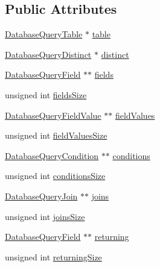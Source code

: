 \subsection*{Public Attributes}
\begin{DoxyCompactItemize}
\item 
\hyperlink{database__query_8h_a38971f81715db3c243144b5e840c2457}{Database\+Query\+Table} $\ast$ \hyperlink{structsDatabaseQuery_a8d34ce4ad0e31c1bc8978ec03d4b5fbf}{table}
\item 
\hyperlink{database__query_8h_a92bb8d2a8239305ec30b4b8c58c4ceba}{Database\+Query\+Distinct} $\ast$ \hyperlink{structsDatabaseQuery_af873390ab854ce4a34f704971d271521}{distinct}
\item 
\hyperlink{database__query_8h_a88215d743b6fc63a879f730b4523dda1}{Database\+Query\+Field} $\ast$$\ast$ \hyperlink{structsDatabaseQuery_a2075e002e2ecbf166d9fbcc6f9780701}{fields}
\item 
unsigned int \hyperlink{structsDatabaseQuery_a052737bce106f2758ba5d5ac663ff57a}{fields\+Size}
\item 
\hyperlink{database__query_8h_a7b9951dae2f92c4aa4e05413557babba}{Database\+Query\+Field\+Value} $\ast$$\ast$ \hyperlink{structsDatabaseQuery_a7bf7cf5cda36b6c6d3701926c35d8972}{field\+Values}
\item 
unsigned int \hyperlink{structsDatabaseQuery_aa203f0cb4e33b39d48e6674250d9f74d}{field\+Values\+Size}
\item 
\hyperlink{database__query_8h_a6266221c78d9f12aa27ae522162f414f}{Database\+Query\+Condition} $\ast$$\ast$ \hyperlink{structsDatabaseQuery_a54e52c15ffef2b87e3b2c7a4d0ffc2f9}{conditions}
\item 
unsigned int \hyperlink{structsDatabaseQuery_a7534216a1d5ad726447b73b6eb4fdbc4}{conditions\+Size}
\item 
\hyperlink{database__query_8h_afa2dc6332756b689eaad7cbd2a4afe8f}{Database\+Query\+Join} $\ast$$\ast$ \hyperlink{structsDatabaseQuery_aa66192f20c6390fd1bd5f2db96860926}{joins}
\item 
unsigned int \hyperlink{structsDatabaseQuery_aca409db9b76aea5d1e83390e2a251fd3}{joins\+Size}
\item 
\hyperlink{database__query_8h_a88215d743b6fc63a879f730b4523dda1}{Database\+Query\+Field} $\ast$$\ast$ \hyperlink{structsDatabaseQuery_ad88d21177dbe929109914b4b75665454}{returning}
\item 
unsigned int \hyperlink{structsDatabaseQuery_a08dafb08cb00fac230eaceb0dfd20c9f}{returning\+Size}
\item 
$$
\end{DoxyCompactItemize}
